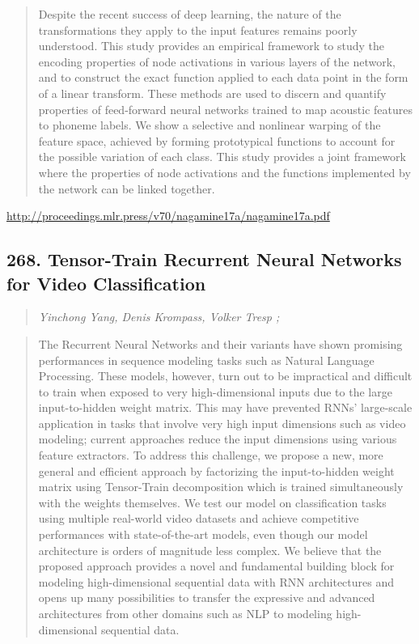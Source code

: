\documentclass{article}
\begin{document}
\begin{quote}
    Despite the recent success of deep learning, the nature of the transformations they apply to the input features remains poorly understood. This study provides an empirical framework to study the encoding properties of node activations in various layers of the network, and to construct the exact function applied to each data point in the form of a linear transform. These methods are used to discern and quantify properties of feed-forward neural networks trained to map acoustic features to phoneme labels. We show a selective and nonlinear warping of the feature space, achieved by forming prototypical functions to account for the possible variation of each class. This study provides a joint framework where the properties of node activations and the functions implemented by the network can be linked together.  \end{quote}

\href{http://proceedings.mlr.press/v70/nagamine17a/nagamine17a.pdf}{http://proceedings.mlr.press/v70/nagamine17a/nagamine17a.pdf}

\subsection{268. Tensor-Train Recurrent Neural Networks for Video Classification}

\begin{quote}
\footnotesize{\textit{Yinchong Yang, Denis Krompass, Volker Tresp ;}}
\end{quote}

\begin{quote}
    The Recurrent Neural Networks and their variants have shown promising performances in sequence modeling tasks such as Natural Language Processing. These models, however, turn out to be impractical and difficult to train when exposed to very high-dimensional inputs due to the large input-to-hidden weight matrix. This may have prevented RNNs’ large-scale application in tasks that involve very high input dimensions such as video modeling; current approaches reduce the input dimensions using various feature extractors. To address this challenge, we propose a new, more general and efficient approach by factorizing the input-to-hidden weight matrix using Tensor-Train decomposition which is trained simultaneously with the weights themselves. We test our model on classification tasks using multiple real-world video datasets and achieve competitive performances with state-of-the-art models, even though our model architecture is orders of magnitude less complex. We believe that the proposed approach provides a novel and fundamental building block for modeling high-dimensional sequential data with RNN architectures and opens up many possibilities to transfer the expressive and advanced architectures from other domains such as NLP to modeling high-dimensional sequential data.  \end{quote}
\end{document}

